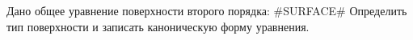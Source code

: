 Дано общее уравнение поверхности второго порядка:
#SURFACE#
Определить тип поверхности и записать каноническую форму уравнения.
